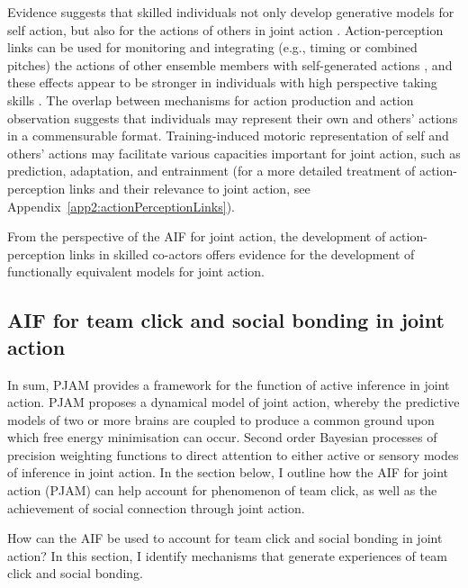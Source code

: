 \begin{CJK}{UTF8}{gbsn}
Evidence suggests that skilled individuals not only develop generative models for self action, but also for the actions of others in joint action \citep{Novembre2012}. Action-perception links can be used for monitoring and integrating (e.g., timing or combined pitches) the actions of other ensemble members with self-generated actions \citep{Loehr2013}, and these effects appear to be stronger in individuals with high perspective taking skills \citep{Novembre2012,Loehr2013}.  The overlap between mechanisms for action production and action observation suggests that individuals may represent their own and others’ actions in a commensurable format.  Training-induced motoric representation of self and others' actions may facilitate various capacities important for joint action, such as prediction, adaptation, and entrainment (for a more detailed treatment of action-perception links and their relevance to joint action, see Appendix~\ref{app2:actionPerceptionLinks}).

From the perspective of the AIF for joint action, the development of action-perception links in skilled co-actors offers evidence for the development of functionally equivalent models for joint action.














\subsection{AIF for team click and social bonding in joint action\label{sect:AIFclickBonding}}

In sum, PJAM provides a framework for the function of active inference in joint action.  PJAM proposes a dynamical model of joint action, whereby the predictive models of two or more brains are coupled to produce a common ground upon which free energy minimisation can occur. Second order Bayesian processes of precision weighting functions to direct attention to either active or sensory modes of inference in joint action.   In the section below, I outline how the AIF for joint action (PJAM) can help account for  phenomenon of team click, as well as the achievement of social connection through joint action.

How can the AIF be used to account for team click and social bonding in joint action? In this section, I identify mechanisms that generate experiences of team click and social bonding.


\end{CJK}
